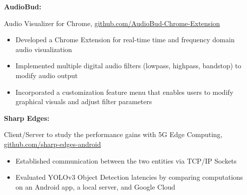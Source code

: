 \documentclass[letterpaper,10pt]{article}
\newcommand{\resumeItem}[2]{
  \item\normalsize{
    {#1}{#2 \vspace{-2pt}}
  }
}
\newcommand{\resumeSubItem}[2]{\resumeItem{#1}{#2}\vspace{-4pt}}
\begin{document}
{      \resumeSubItem{\textbf{AudioBud: }}
      {Audio Visualizer for Chrome, \href{https://github.com/eric-delacruz-prod/AudioBud-Chrome-Extension}{github.com/AudioBud-Chrome-Extension}
         \vspace{-4pt}
         \begin{itemize}
            \item Developed a Chrome Extension for real-time time and frequency domain audio visualization
            \vspace{-1pt}
            \item Implemented multiple digital audio filters (lowpass, highpass, bandstop) to modify audio output
            \vspace{-1pt}
            \item Incorporated a customization feature menu that enables users to modify graphical visuals and adjust filter parameters
         \end{itemize}
      }

      \vspace{4pt}

      \resumeSubItem{\textbf{Sharp Edges: }}
      {Client/Server to study the performance gains with 5G Edge Computing, \href{https://github.com/erjseals/sharp-edges-android}{github.com/sharp-edges-android}
         \vspace{-4pt}
         \begin{itemize}
          \item Established communication between the two entities via TCP/IP Sockets 
          \vspace{-1pt}
          \item Evaluated YOLOv3 Object Detection latencies by comparing computations on an Android app, a local server, and Google Cloud
         \end{itemize}
      }


}
\end{document}
